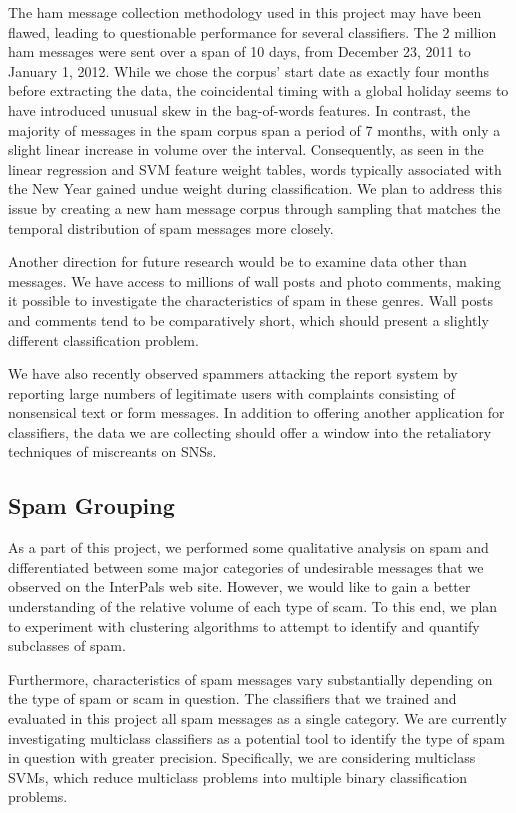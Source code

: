 \documentclass[preprint]{acm_proc_article-sp}
\begin{document}
The ham message collection methodology used in this project may have been flawed, leading to questionable 
performance for several classifiers. The 2 million ham messages were sent over a span of 10 days, from 
December 23, 2011 to January 1, 2012. While we chose the corpus' start date as exactly four months before 
extracting the data, the coincidental timing with a global holiday seems to have introduced unusual 
skew in the bag-of-words features. In contrast, the majority of messages in the spam corpus span a period of 
7 months, with only a slight linear increase in volume over the interval.  Consequently, as seen in 
the linear regression and SVM feature weight tables, words typically associated with the New Year gained 
undue weight during classification.  We plan to address this issue by creating a new ham message corpus 
through sampling that matches the temporal distribution of spam messages more closely.

Another direction for future research would be to examine data other than messages. We have access to millions 
of wall posts and photo comments, making it possible to investigate the characteristics of spam in these genres. 
Wall posts and comments tend to be comparatively short, which should present a slightly different classification 
problem.

We have also recently observed spammers attacking the report system by reporting large numbers of legitimate users 
with complaints consisting of nonsensical text or form messages. In addition to offering another application for 
classifiers, the data we are collecting should offer a window into the retaliatory techniques of miscreants on 
SNSs.

\subsection{Spam Grouping}

As a part of this project, we performed some qualitative analysis on spam and differentiated between 
some major categories of undesirable messages that we observed on the InterPals web site. However, we would 
like to gain a better understanding of the relative volume of each type of scam. To this end, we plan to 
experiment with clustering algorithms to attempt to identify and quantify subclasses of spam. 

Furthermore, characteristics of spam messages vary substantially depending on the type of spam or scam in question. 
The classifiers that we trained and evaluated in this project all spam messages as a single category. We are currently 
investigating multiclass classifiers as a potential tool to identify the type of 
spam in question with greater precision. Specifically, we are considering multiclass SVMs, which reduce 
multiclass problems into multiple binary classification problems.\cite{duan} 
\end{document}
